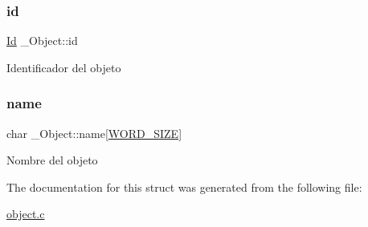 \subsubsection{\texorpdfstring{id}{id}}
{\footnotesize\ttfamily \hyperlink{types_8h_a845e604fb28f7e3d97549da3448149d3}{Id} \+\_\+\+Object\+::id}

Identificador del objeto \mbox{\label{struct__Object_a3dab853826b88558a2c07dec50b96d57}} 
\subsubsection{\texorpdfstring{name}{name}}
{\footnotesize\ttfamily char \+\_\+\+Object\+::name\mbox{[}\hyperlink{types_8h_a92ed8507d1cd2331ad09275c5c4c1c89}{W\+O\+R\+D\+\_\+\+S\+I\+ZE}\mbox{]}}

Nombre del objeto 

The documentation for this struct was generated from the following file\+:\begin{DoxyCompactItemize}
\item 
\hyperlink{object_8c}{object.\+c}\end{DoxyCompactItemize}
